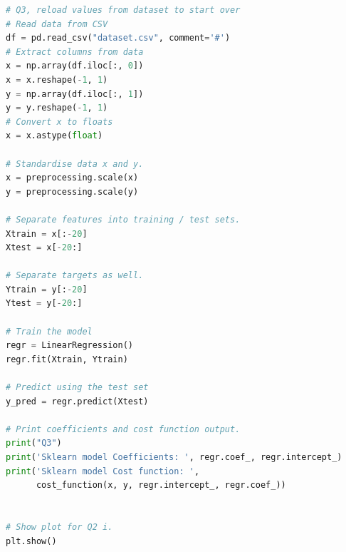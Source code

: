 \documentclass[10pt]{article}
\begin{document}
\begin{lstlisting}[language=Python]
# Q3, reload values from dataset to start over
# Read data from CSV
df = pd.read_csv("dataset.csv", comment='#')
# Extract columns from data
x = np.array(df.iloc[:, 0])
x = x.reshape(-1, 1)
y = np.array(df.iloc[:, 1])
y = y.reshape(-1, 1)
# Convert x to floats
x = x.astype(float)

# Standardise data x and y.
x = preprocessing.scale(x)
y = preprocessing.scale(y)

# Separate features into training / test sets.
Xtrain = x[:-20]
Xtest = x[-20:]

# Separate targets as well.
Ytrain = y[:-20]
Ytest = y[-20:]

# Train the model
regr = LinearRegression()
regr.fit(Xtrain, Ytrain)

# Predict using the test set
y_pred = regr.predict(Xtest)

# Print coefficients and cost function output.
print("Q3")
print('Sklearn model Coefficients: ', regr.coef_, regr.intercept_)
print('Sklearn model Cost function: ',
      cost_function(x, y, regr.intercept_, regr.coef_))


# Show plot for Q2 i.
plt.show()
\end{lstlisting}
\end{document}
